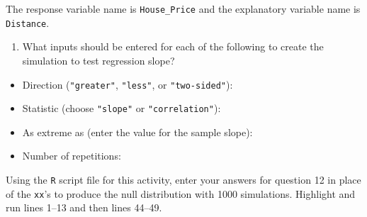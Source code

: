 \documentclass[
]{report}
\providecommand{\tightlist}{%
  \setlength{\itemsep}{0pt}\setlength{\parskip}{0pt}}
\begin{document}
The response variable name is \texttt{House\_Price} and the explanatory variable name is \texttt{Distance}.

\begin{enumerate}
\def\labelenumi{\arabic{enumi}.}
\setcounter{enumi}{11}
\tightlist
\item
  What inputs should be entered for each of the following to create the simulation to test regression slope?
\end{enumerate}

\vspace{.5 mm}

\begin{itemize}
\tightlist
\item
  Direction (\texttt{"greater"}, \texttt{"less"}, or \texttt{"two-sided"}):
\end{itemize}

\vspace{.2in}

\begin{itemize}
\tightlist
\item
  Statistic (choose \texttt{"slope"} or \texttt{"correlation"}):
\end{itemize}

\vspace{.2in}

\begin{itemize}
\tightlist
\item
  As extreme as (enter the value for the sample slope):
\end{itemize}

\vspace{0.2in}

\begin{itemize}
\tightlist
\item
  Number of repetitions:
\end{itemize}

\vspace{.2in}

Using the \texttt{R} script file for this activity, enter your answers for question 12 in place of the \texttt{xx}'s to produce the null distribution with 1000 simulations. Highlight and run lines 1--13 and then lines 44--49.
\end{document}
